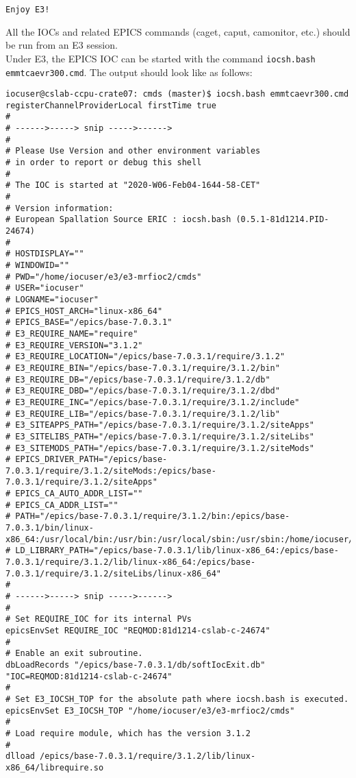 \documentclass[11pt
  , a4paper
  , article
  , oneside
  , showtrims
]{memoir}
\begin{document}
{\begin{lstlisting}[style=termstyle]
Enjoy E3!
\end{lstlisting}
All the IOCs and related EPICS commands (caget, caput, camonitor, etc.) should be run from an E3 session.\\

Under E3, the EPICS IOC can be started with the command \texttt{iocsh.bash emmtcaevr300.cmd}. The output should look like as follows:
\begin{lstlisting}[style=termstyle]
iocuser@cslab-ccpu-crate07: cmds (master)$ iocsh.bash emmtcaevr300.cmd
registerChannelProviderLocal firstTime true
#
# ------>-----> snip ----->------>
#
# Please Use Version and other environment variables
# in order to report or debug this shell
#
# The IOC is started at "2020-W06-Feb04-1644-58-CET"
#
# Version information:
# European Spallation Source ERIC : iocsh.bash (0.5.1-81d1214.PID-24674)
#
# HOSTDISPLAY=""
# WINDOWID=""
# PWD="/home/iocuser/e3/e3-mrfioc2/cmds"
# USER="iocuser"
# LOGNAME="iocuser"
# EPICS_HOST_ARCH="linux-x86_64"
# EPICS_BASE="/epics/base-7.0.3.1"
# E3_REQUIRE_NAME="require"
# E3_REQUIRE_VERSION="3.1.2"
# E3_REQUIRE_LOCATION="/epics/base-7.0.3.1/require/3.1.2"
# E3_REQUIRE_BIN="/epics/base-7.0.3.1/require/3.1.2/bin"
# E3_REQUIRE_DB="/epics/base-7.0.3.1/require/3.1.2/db"
# E3_REQUIRE_DBD="/epics/base-7.0.3.1/require/3.1.2/dbd"
# E3_REQUIRE_INC="/epics/base-7.0.3.1/require/3.1.2/include"
# E3_REQUIRE_LIB="/epics/base-7.0.3.1/require/3.1.2/lib"
# E3_SITEAPPS_PATH="/epics/base-7.0.3.1/require/3.1.2/siteApps"
# E3_SITELIBS_PATH="/epics/base-7.0.3.1/require/3.1.2/siteLibs"
# E3_SITEMODS_PATH="/epics/base-7.0.3.1/require/3.1.2/siteMods"
# EPICS_DRIVER_PATH="/epics/base-7.0.3.1/require/3.1.2/siteMods:/epics/base-7.0.3.1/require/3.1.2/siteApps"
# EPICS_CA_AUTO_ADDR_LIST=""
# EPICS_CA_ADDR_LIST=""
# PATH="/epics/base-7.0.3.1/require/3.1.2/bin:/epics/base-7.0.3.1/bin/linux-x86_64:/usr/local/bin:/usr/bin:/usr/local/sbin:/usr/sbin:/home/iocuser/.local/bin:/home/iocuser/bin"
# LD_LIBRARY_PATH="/epics/base-7.0.3.1/lib/linux-x86_64:/epics/base-7.0.3.1/require/3.1.2/lib/linux-x86_64:/epics/base-7.0.3.1/require/3.1.2/siteLibs/linux-x86_64"
#
# ------>-----> snip ----->------>
#
# Set REQUIRE_IOC for its internal PVs
epicsEnvSet REQUIRE_IOC "REQMOD:81d1214-cslab-c-24674"
#
# Enable an exit subroutine.
dbLoadRecords "/epics/base-7.0.3.1/db/softIocExit.db" "IOC=REQMOD:81d1214-cslab-c-24674"
#
# Set E3_IOCSH_TOP for the absolute path where iocsh.bash is executed.
epicsEnvSet E3_IOCSH_TOP "/home/iocuser/e3/e3-mrfioc2/cmds"
#
# Load require module, which has the version 3.1.2
#
dlload /epics/base-7.0.3.1/require/3.1.2/lib/linux-x86_64/librequire.so

\end{lstlisting}}
\end{document}
